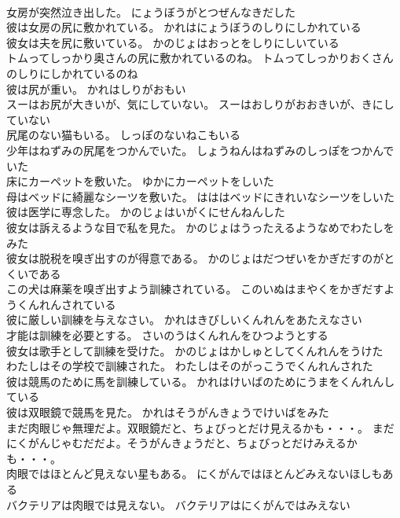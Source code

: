 \documentclass[8pt]{extreport}
\begin{document}
\begin{CJK}{UTF8}{min}
\\	女房が突然泣き出した。	にょうぼうがとつぜんなきだした 
\\	彼は女房の尻に敷かれている。	かれはにょうぼうのしりにしかれている 
\\	彼女は夫を尻に敷いている。	かのじょはおっとをしりにしいている 
\\	トムってしっかり奥さんの尻に敷かれているのね。	トムってしっかりおくさんのしりにしかれているのね 
\\	彼は尻が重い。	かれはしりがおもい 
\\	スーはお尻が大きいが、気にしていない。	スーはおしりがおおきいが、きにしていない 
\\	尻尾のない猫もいる。	しっぽのないねこもいる 
\\	少年はねずみの尻尾をつかんでいた。	しょうねんはねずみのしっぽをつかんでいた 
\\	床にカーペットを敷いた。	ゆかにカーペットをしいた 
\\	母はベッドに綺麗なシーツを敷いた。	はははベッドにきれいなシーツをしいた 
\\	彼は医学に専念した。	かのじょはいがくにせんねんした 
\\	彼女は訴えるような目で私を見た。	かのじょはうったえるようなめでわたしをみた 
\\	彼女は脱税を嗅ぎ出すのが得意である。	かのじょはだつぜいをかぎだすのがとくいである 
\\	この犬は麻薬を嗅ぎ出すよう訓練されている。	このいぬはまやくをかぎだすようくんれんされている 
\\	彼に厳しい訓練を与えなさい。	かれはきびしいくんれんをあたえなさい 
\\	才能は訓練を必要とする。	さいのうはくんれんをひつようとする 
\\	彼女は歌手として訓練を受けた。	かのじょはかしゅとしてくんれんをうけた 
\\	わたしはその学校で訓練された。	わたしはそのがっこうでくんれんされた 
\\	彼は競馬のために馬を訓練している。	かれはけいばのためにうまをくんれんしている 
\\	彼は双眼鏡で競馬を見た。	かれはそうがんきょうでけいばをみた 
\\	まだ肉眼じゃ無理だよ。双眼鏡だと、ちょびっとだけ見えるかも・・・。	まだにくがんじゃむだだよ。そうがんきょうだと、ちょびっとだけみえるかも・・・。 
\\	肉眼ではほとんど見えない星もある。	にくがんではほとんどみえないほしもある 
\\	バクテリアは肉眼では見えない。	バクテリアはにくがんではみえない 

\end{CJK}
\end{document}

